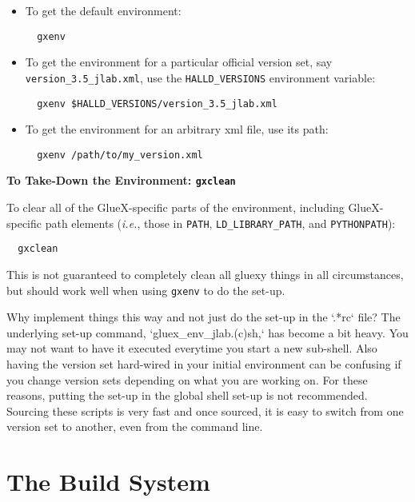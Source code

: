 \documentclass[12pt, letterpaper]{article}
\begin{document}
\begin{description}
\begin{description}
\begin{itemize}
\item To get the default environment:
\begin{verbatim}
  gxenv
\end{verbatim}
\item To get the environment for a particular official version set, say {\tt version\_3.5\_jlab.xml}, use the {\tt HALLD\_VERSIONS} environment variable:
\begin{verbatim}
  gxenv $HALLD_VERSIONS/version_3.5_jlab.xml
\end{verbatim}
\item To get the environment for an arbitrary xml file, use its path:
\begin{verbatim}
  gxenv /path/to/my_version.xml
\end{verbatim}
\end{itemize}

\item{\bf To Take-Down the Environment: {\tt gxclean}}

To clear all of the GlueX-specific parts of the environment, including
GlueX-specific path elements ({\it i.e.}, those in {\tt PATH}, {\tt LD\_LIBRARY\_PATH}, and {\tt PYTHONPATH}):
\begin{verbatim}
  gxclean
\end{verbatim}
This is not guaranteed to completely clean all gluexy things in all
circumstances, but should work well when using {\tt gxenv} to do the
set-up.

\end{description}
\end{description}

Why implement things this way and not just do the set-up in the `.*rc`
file? The underlying set-up command, `gluex\_env\_jlab.(c)sh,` has
become a bit heavy. You may not want to have it executed everytime you
start a new sub-shell. Also having the version set hard-wired in your
initial environment can be confusing if you change version sets
depending on what you are working on. For these reasons, putting the
set-up in the global shell set-up is not recommended. Sourcing these
scripts is very fast and once sourced, it is easy to switch from one
version set to another, even from the command line.

\section{The Build System}
\end{document}
